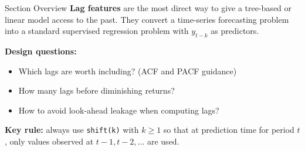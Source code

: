 \documentclass[aspectratio=169, 10pt]{beamer}
\begin{document}

\begin{frame}{Section Overview}
  \textbf{Lag features} are the most direct way to give a
  tree-based or linear model access to the past. They convert a
  time-series forecasting problem into a standard supervised
  regression problem with $y_{t-k}$ as predictors.

  \medskip
  \textbf{Design questions:}
  \begin{itemize}
    \item Which lags are worth including? (ACF and PACF guidance)
    \item How many lags before diminishing returns?
    \item How to avoid look-ahead leakage when computing lags?
  \end{itemize}

  \medskip
  \textbf{Key rule:} always use \texttt{shift(k)} with $k \geq 1$
  so that at prediction time for period $t$, only values observed at
  $t-1, t-2, \ldots$ are used.
\end{frame}
\end{document}
